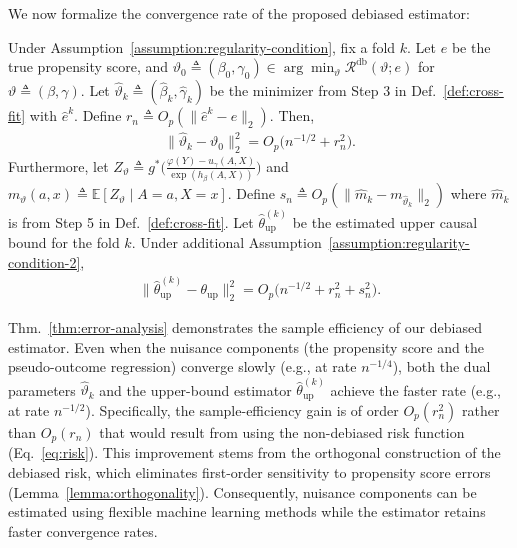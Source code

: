 We now formalize the convergence rate of the proposed debiased estimator:
\begin{theorem}\label{thm:error-analysis}
    \normalfont
    Under Assumption~\ref{assumption:regularity-condition}, fix a fold $k$. Let $e$ be the true propensity score, and $\vartheta_0 \triangleq (\beta_0,\gamma_0) \in \arg\min_{\vartheta} \mathcal{R}^{\mathrm{db}}(\vartheta; e)$ for $\vartheta \triangleq (\beta,\gamma)$. Let $\widehat{\vartheta}_k \triangleq (\widehat{\beta}_k, \widehat{\gamma}_k)$ be the minimizer from Step 3 in Def.~\ref{def:cross-fit} with $\widehat{e}^k$. Define $r_n \triangleq O_p(\| \widehat{e}^k - e \|_2) $. Then, 
    \begin{align}\label{eq:thm:error-analysis-1}
        \|\widehat\vartheta_k - \vartheta_0\|^2_{2} = O_p\big(n^{-1/2} + r_n^2\big).
    \end{align}
    Furthermore, let $Z_{\vartheta} \triangleq g^{\ast}\big( \tfrac{\varphi(Y) - u_{\gamma}(A,X)}{ \exp(h_\beta(A,X))}\big)$ and $m_{\vartheta}(a,x) \triangleq \mathbb{E}[Z_{\vartheta} \mid A=a,X=x]$. Define $s_n \triangleq O_p(\|\widehat{m}_k - m_{\widehat{\vartheta}_k} \|_2)$ where $\widehat{m}_k$ is from Step 5 in Def.~\ref{def:cross-fit}. Let $\widehat{\theta}^{(k)}_{\mathrm{up}}$ be the estimated upper causal bound for the fold $k$. Under additional Assumption~\ref{assumption:regularity-condition-2},
    \begin{align}\label{eq:thm:error-analysis-2}
        \big\| \widehat{\theta}^{(k)}_{\mathrm{up}} - \theta_{\mathrm{up}} \big\|_2^2 = O_p\big( n^{-1/2} + r_n^2 + s_n^2 \big).
    \end{align}
\end{theorem}
Thm.~\ref{thm:error-analysis} demonstrates the sample efficiency of our debiased estimator. Even when the nuisance components (the propensity score and the pseudo-outcome regression) converge slowly (e.g., at rate $n^{-1/4}$), both the dual parameters $\widehat{\vartheta}_k$ and the upper-bound estimator $\widehat{\theta}_{\mathrm{up}}^{(k)}$ achieve the faster rate (e.g., at rate $n^{-1/2}$). Specifically, the sample-efficiency gain is of order $O_p(r^2_n)$ rather than $O_p(r_n)$ that would result from using the non-debiased risk function (Eq.~\eqref{eq:risk}). This improvement stems from the orthogonal construction of the debiased risk, which eliminates first-order sensitivity to propensity score errors (Lemma~\ref{lemma:orthogonality}). Consequently, nuisance components can be estimated using flexible machine learning methods while the estimator retains faster convergence rates.

